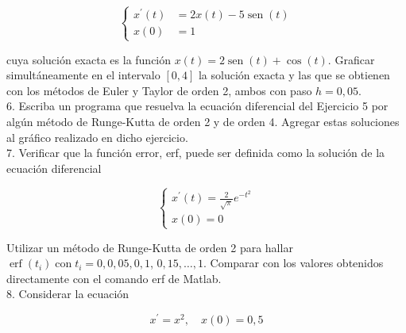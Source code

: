 \documentclass[10pt]{book}
\begin{document}
$$
\left\{\begin{aligned}
x^{\prime}(t) & =2 x(t)-5 \operatorname{sen}(t) \\
x(0) & =1
\end{aligned}\right.
$$

cuya solución exacta es la función $x(t)=2 \operatorname{sen}(t)+\cos (t)$. Graficar simultáneamente en el intervalo $[0,4]$ la solución exacta y las que se obtienen con los métodos de Euler y Taylor de orden 2, ambos con paso $h=0,05$.\\
6. Escriba un programa que resuelva la ecuación diferencial del Ejercicio 5 por algún método de Runge-Kutta de orden 2 y de orden 4. Agregar estas soluciones al gráfico realizado en dicho ejercicio.\\
7. Verificar que la función error, erf, puede ser definida como la solución de la ecuación diferencial

$$
\left\{\begin{array}{r}
x^{\prime}(t)=\frac{2}{\sqrt{\pi}} e^{-t^{2}} \\
x(0)=0
\end{array}\right.
$$

Utilizar un método de Runge-Kutta de orden 2 para hallar $\operatorname{erf}\left(t_{i}\right) \operatorname{con} t_{i}=0,0,05,0,1$, $0,15, \ldots, 1$. Comparar con los valores obtenidos directamente con el comando erf de Matlab.\\
8. Considerar la ecuación

$$
x^{\prime}=x^{2}, \quad x(0)=0,5
$$
\end{document}
